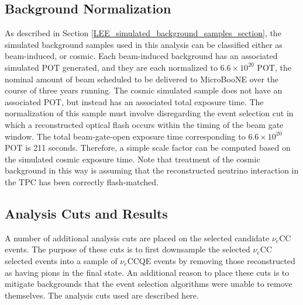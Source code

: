 \subsection{Background Normalization}\label{LEE_background_normalization_section}
As described in Section \ref{LEE_simulated_background_samples_section}, the simulated background samples used in this analysis can be classified either as beam-induced, or cosmic. Each beam-induced background has an associated simulated POT generated, and they are each normalized to $6.6\times10^{20}$ POT, the nominal amount of beam scheduled to be delivered to MicroBooNE over the course of three years running. The cosmic simulated sample does not have an associated POT, but instead has an associated total exposure time. The normalization of this sample must involve disregarding the event selection cut in which a reconstructed optical flash occurs within the timing of the beam gate window. The total beam-gate-open exposure time corresponding to $6.6\times10^{20}$ POT is 211 seconds. Therefore, a simple scale factor can be computed based on the simulated cosmic exposure time. Note that treatment of the cosmic background in this way is assuming that the reconstructed neutrino interaction in the TPC has been correctly flash-matched.


\subsection{Analysis Cuts and Results}\label{analysis_cut_descript_section}


A number of additional analysis cuts are placed on the selected candidate $\nu_e$CC events. The purpose of these cuts is to first downsample the selected $\nu_e$CC selected events into a sample of $\nu_e$CCQE events by removing those reconstructed as having pions in the final state. An additional reason to place these cuts is to mitigate backgrounds that the event selection algorithms were unable to remove themselves. The analysis cuts used are described here.\\

